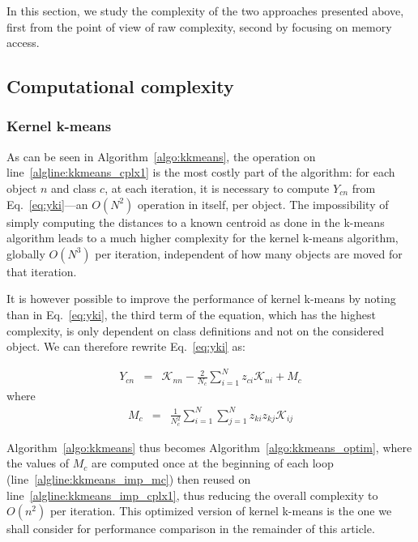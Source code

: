 \documentclass[10pt,letterpaper]{article}
\newcommand{\cad}{---} %
\begin{document}
In this section, we study the complexity of the two approaches presented above, first from the point of view of raw complexity, second by focusing on memory access.

\subsection{Computational complexity}

\subsubsection{Kernel k-means}

As can be seen in Algorithm~\ref{algo:kkmeans}, the operation on line~\ref{algline:kkmeans_cplx1} is the most costly part of the algorithm: for each object $n$ and class $c$, at each iteration, it is necessary to compute $Y_{cn}$ from Eq.~\ref{eq:yki}\cad{}an $O(N^2)$ operation in itself, per object. The impossibility of simply computing the distances to a known centroid as done in the k-means algorithm leads to a much higher complexity for the kernel k-means algorithm, globally $O(N^3)$ per iteration, independent of how many objects are moved for that iteration.

It is however possible to improve the performance of kernel k-means by noting than in Eq.~\ref{eq:yki}, the third term of the equation, which has the highest complexity, is only dependent on class definitions and not on the considered object. We can therefore rewrite Eq.~\ref{eq:yki} as:

\begin{eqnarray}
Y_{cn} & = & \mathcal{K}_{nn} - \frac{2}{N_c} \sum_{i=1}^{N} z_{ci} \mathcal{K}_{ni} + M_c \label{eq:yki_improved}
\end{eqnarray}
where
\begin{eqnarray}
M_c    & = & \frac{1}{N_c^2} \sum_{i=1}^{N} \sum_{j=1}^{N} z_{ki} z_{kj} \mathcal{K}_{ij} \label{eq:mc}
\end{eqnarray}

Algorithm~\ref{algo:kkmeans} thus becomes Algorithm~\ref{algo:kkmeans_optim}, where the values of $M_c$ are computed once at the beginning of each loop (line~\ref{algline:kkmeans_imp_mc}) then reused on line~\ref{algline:kkmeans_imp_cplx1}, thus reducing the overall complexity to $O(n^2)$ per iteration. This optimized version of kernel k-means is the one we shall consider for performance comparison in the remainder of this article.
\end{document}
